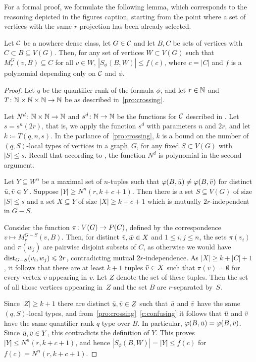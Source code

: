 For a formal proof, we formulate the following lemma,
which corresponds to the reasoning depicted in the figures caption,
starting from the point where a set of vertices with the same $r$-projection has been already selected.
\begin{lemma}\label{lem:num-types-same-class}
 Let $\mathcal{C}$ be a nowhere dense class,
let $G\in\mathcal{C}$ and let $B,C$ be sets of vertices with
$C\subset B\subseteq V(G)$.
Then, for any set of vertices $W\subset V(G)$ such that 
$M_r^G(v,B)\subseteq C$ for all $v\in W$, 
 $|S_\phi(B,W)|\le f(c)$, where $c=|C|$ and $f$ is a polynomial depending only on $\mathcal{C}$ and $\phi$.
\end{lemma}

\begin{proof}
Let $q$ be the quantifier rank of the formula $\phi$,
and let $r\in \mathbb{N}$ and~$T\colon \mathbb{N}\times \mathbb{N}\times \mathbb{N}\to \mathbb{N}$  
be as described in~\cref{pro:crossing}.

Let $N^d\colon \mathbb{N}\times\mathbb{N}\to\mathbb{N}$ and $s^d\colon \mathbb{N}\to\mathbb{N}$ be
the functions for $\mathcal{C}$ described in . 
Let $s=s^n(2r)$, that is, we apply the function $s^d$ with
parameters $n$ and $2r$, and let $k\coloneqq T(q,n,s)$. In the parlance of~\cref{pro:crossing},
$k$ is a bound on the number of $(q,S)$-local types of vertices in a graph~$G$,
for any fixed $S\subset V(G)$ with $|S|\le s$. Recall that according
to , the function $N^d$ is polynomial in the second
argument. 

Let $Y\subseteq W^n$ be a maximal set of $n$-tuples 
such that $\varphi(B,\bar{u})\neq \varphi(B,\bar{v})$ 
for distinct $\bar{u}, \bar{v}\in Y$.
Suppose $|Y|\geq N^n(r,k+c+1)$. Then there is a  
set $S\subseteq V(G)$ of size $|S|\leq s$ 
and a set $X\subseteq Y$ of size $|X|\geq k+c+1$ which is 
mutually $2r$-independent in $G-S$. 

Consider the function $\pi\colon V(G)\to P(C)$,
defined by the correspondence
 $v\mapsto M_r^{G-S}(v,B)$.
 Then, for distinct $\bar{v},\bar{w}\in X$
 and $1\leq i,j\leq n$, 
 the sets $\pi(v_i)$ and $\pi(w_j)$ are pairwise disjoint subsets of $C$,
as otherwise we would have \mbox{$\mathrm{dist}_{G-S}(v_i,w_j)\leqslant 2r$},
contradicting mutual $2r$-independence.
As  $|X|\ge k+|C|+1$, it follows that 
there are at least $k+1$ tuples $\bar{v}\in X$
such that  $\pi(v)=\emptyset$ for every vertex $v$ appearing in $\bar v$. Let $Z$ denote the set of these tuples. Then the set of all those vertices appearing in~$Z$ and the
set $B$ are $r$-separated by~$S$.

Since $|Z|\geq k+1$ there are  distinct $\bar{u},\bar{v}\in Z$ such that 
$\bar{u}$ and $\bar{v}$ have the same $(q,S)$-local types,
and from~\cref{pro:crossing}~\cref{c:confusing} it follows that $\bar{u}$ and $\bar{v}$
have the same quantifier rank $q$ type over $B$.
In particular, $\varphi(B,\bar{u})=\varphi(B,\bar{v})$. Since $\bar{u},\bar{v}\in Y$, this contradicts the definition of $Y$. This proves $|Y|\le N^n(r,k+c+1)$,
and hence $|S_\phi(B,W)|=|Y|\le f(c)$ for 
$f(c)= N^n(r,k+c+1)$.
\end{proof}


